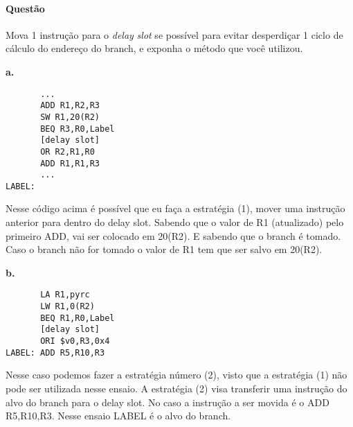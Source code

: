 \documentclass{article}
\begin{document}
\paragraph{Questão} Mova 1 instrução para o \textit{delay} \textit{slot} se 
possível para evitar desperdiçar 1 ciclo de cálculo do endereço do branch, e 
exponha o método que você utilizou.

\textbf{a.}

\begin{verbatim}
       ...
       ADD R1,R2,R3
       SW R1,20(R2)
       BEQ R3,R0,Label
       [delay slot]
       OR R2,R1,R0
       ADD R1,R1,R3
       ...
LABEL:
\end{verbatim}

Nesse código acima é possível que eu faça a estratégia (1), mover uma instrução 
anterior para dentro do delay slot. Sabendo que o valor de R1 (atualizado) pelo 
primeiro ADD, vai ser colocado em 20(R2). E sabendo que o branch é tomado. Caso 
o branch não for tomado o valor de R1 tem que ser salvo em 20(R2).

\clearpage
\textbf{b.}

\begin{verbatim}
       LA R1,pyrc
       LW R1,0(R2)
       BEQ R1,R0,Label
       [delay slot]
       ORI $v0,R3,0x4
LABEL: ADD R5,R10,R3
\end{verbatim}

Nesse caso podemos fazer a estratégia número (2), visto que a estratégia (1) 
não pode ser utilizada nesse ensaio. A estratégia (2) visa transferir uma 
instrução do alvo do branch para o delay slot. No caso a instrução a ser movida 
é o ADD R5,R10,R3. Nesse ensaio LABEL é o alvo do branch.
\end{document}

